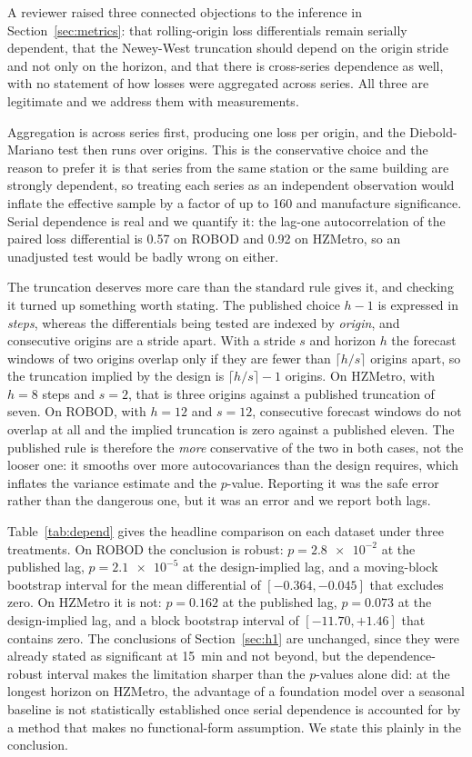 \documentclass[11pt]{article}
\theoremstyle{plain}
\theoremstyle{definition}
\theoremstyle{remark}
\newif\ifrevisionmarkup
\newcommand{\new}[1]{\ifrevisionmarkup\textcolor{revision}{#1}\else#1\fi}
\begin{document}
\new{A reviewer raised three connected objections to the inference in Section~\ref{sec:metrics}: that rolling-origin loss differentials remain serially dependent, that the Newey-West truncation should depend on the origin stride and not only on the horizon, and that there is cross-series dependence as well, with no statement of how losses were aggregated across series. All three are legitimate and we address them with measurements.}

\new{Aggregation is across series first, producing one loss per origin, and the Diebold-Mariano test then runs over origins. This is the conservative choice and the reason to prefer it is that series from the same station or the same building are strongly dependent, so treating each series as an independent observation would inflate the effective sample by a factor of up to \num{160} and manufacture significance. Serial dependence is real and we quantify it: the lag-one autocorrelation of the paired loss differential is \num{0.57} on ROBOD and \num{0.92} on HZMetro, so an unadjusted test would be badly wrong on either.}

\new{The truncation deserves more care than the standard rule gives it, and checking it turned up something worth stating. The published choice $h-1$ is expressed in \emph{steps}, whereas the differentials being tested are indexed by \emph{origin}, and consecutive origins are a stride apart. With a stride $s$ and horizon $h$ the forecast windows of two origins overlap only if they are fewer than $\lceil h/s \rceil$ origins apart, so the truncation implied by the design is $\lceil h/s\rceil - 1$ origins. On HZMetro, with $h=8$ steps and $s=2$, that is three origins against a published truncation of seven. On ROBOD, with $h=12$ and $s=12$, consecutive forecast windows do not overlap at all and the implied truncation is zero against a published eleven. The published rule is therefore the \emph{more} conservative of the two in both cases, not the looser one: it smooths over more autocovariances than the design requires, which inflates the variance estimate and the $p$-value. Reporting it was the safe error rather than the dangerous one, but it was an error and we report both lags.}

\new{Table~\ref{tab:depend} gives the headline comparison on each dataset under three treatments. On ROBOD the conclusion is robust: $p = \num{2.8e-2}$ at the published lag, $p = \num{2.1e-5}$ at the design-implied lag, and a moving-block bootstrap interval for the mean differential of $[-0.364, -0.045]$ that excludes zero. On HZMetro it is not: $p = \num{0.162}$ at the published lag, $p = \num{0.073}$ at the design-implied lag, and a block bootstrap interval of $[-11.70, +1.46]$ that contains zero. The conclusions of Section~\ref{sec:h1} are unchanged, since they were already stated as significant at \SI{15}{\minute} and not beyond, but the dependence-robust interval makes the limitation sharper than the $p$-values alone did: at the longest horizon on HZMetro, the advantage of a foundation model over a seasonal baseline is not statistically established once serial dependence is accounted for by a method that makes no functional-form assumption. We state this plainly in the conclusion.}
\end{document}

